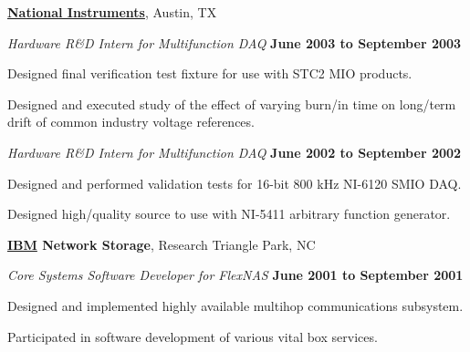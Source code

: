 \documentclass[10pt]{article}           %
\newcommand{\halfblankline}{\quad\vspace{-0.5\baselineskip}\pagebreak[3]}
\begin{document}
\href{http://www.ni.com/}{\textbf{National Instruments}},
Austin, TX
\begin{outerlist}

\item[] \textit{Hardware R\&D Intern for Multifunction DAQ}%
        \hfill \textbf{June 2003 to September 2003}
\begin{innerlist}
\item Designed final verification test fixture for use with STC2 MIO
        products.
\item Designed and executed study of the effect of varying burn\-/in time
        on long\-/term drift of common industry voltage references.
\end{innerlist}

\item[] \textit{Hardware R\&D Intern for Multifunction DAQ}%
        \hfill \textbf{June 2002 to September 2002}
\begin{innerlist}
\item Designed and performed validation tests for 16-bit 800 kHz
        NI-6120 SMIO DAQ.

\item Designed high\-/quality source to use with NI-5411 arbitrary
        function generator.
\end{innerlist}

\end{outerlist}

\halfblankline

\textbf{\href{http://www.ibm.com/}{IBM} Network Storage},
Research Triangle Park, NC
\begin{outerlist}

\item[] \textit{Core Systems Software Developer for FlexNAS}%
        \hfill \textbf{June 2001 to September 2001}
\begin{innerlist}
\item Designed and implemented highly available multihop communications
        subsystem.
\item Participated in software development of various vital box
        services.
\end{innerlist}

\end{outerlist}

\halfblankline
\end{document}
